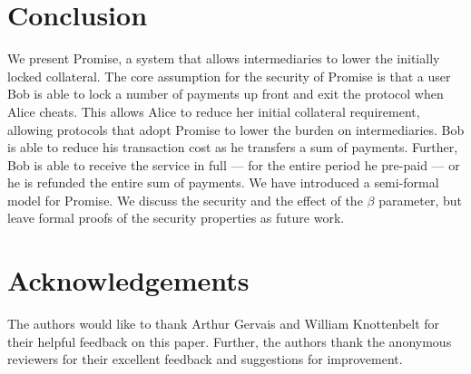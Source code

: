 \documentclass[runningheads]{llncs}
\newcommand{\sys}{Promise\xspace}
\newcommand{\todom}[1]{\todo[linecolor=green,backgroundcolor=green!25,bordercolor=green,inline,caption={}]{Todo for Dominik: #1}}
\begin{document}


\section{Conclusion}
\label{sec:conclusion}

We present \sys, a system that allows intermediaries to lower the initially locked collateral.
The core assumption for the security of \sys is that a user Bob is able to lock a number of payments up front and exit the protocol when Alice cheats.
This allows Alice to reduce her initial collateral requirement, allowing protocols that adopt \sys to lower the burden on intermediaries.
Bob is able to reduce his transaction cost as he transfers a sum of payments.
Further, Bob is able to receive the service in full --- for the entire period he pre-paid --- or he is refunded the entire sum of payments.
We have introduced a semi-formal model for \sys.
We discuss the security and the effect of the $\beta$ parameter, but leave formal proofs of the security properties as future work.


\section*{Acknowledgements}
The authors would like to thank Arthur Gervais and William Knottenbelt for their helpful feedback on this paper. Further, the authors thank the anonymous reviewers for their excellent feedback and suggestions for improvement.



\end{document}
